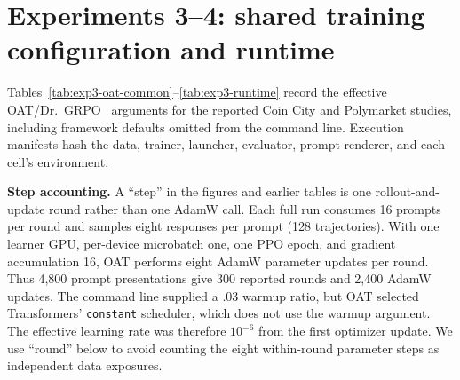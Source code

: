 \section{Experiments 3--4: shared training configuration and runtime}
\label{app:exp3-complete-training-setup}

Tables~\ref{tab:exp3-oat-common}--\ref{tab:exp3-runtime} record the effective
OAT/Dr.~GRPO~\citep{liu2024oat} arguments for the reported Coin City and Polymarket studies, including framework defaults omitted from the command line.
Execution manifests hash the data, trainer, launcher, evaluator, prompt
renderer, and each cell's environment.

\noindent\textbf{Step accounting.}
A ``step'' in the figures and earlier tables is one rollout-and-update round rather than one
AdamW call.  Each full run consumes 16 prompts per round and samples eight responses
per prompt (128 trajectories).  With one learner GPU, per-device microbatch one, one
PPO epoch, and gradient accumulation 16, OAT performs eight AdamW parameter updates per
round. Thus 4,800 prompt presentations give 300 reported rounds and 2,400 AdamW
updates. The command line supplied a .03 warmup ratio, but OAT selected
Transformers' \texttt{constant} scheduler, which does not use the warmup argument.
The effective learning rate was therefore $10^{-6}$ from the first optimizer
update. We use ``round'' below to avoid counting the eight within-round parameter
steps as independent data exposures.

